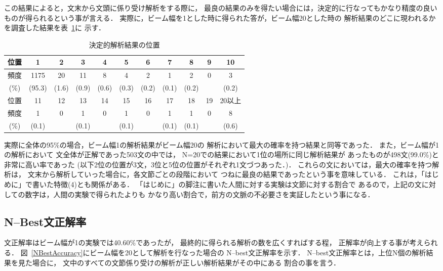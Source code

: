 この結果によると，文末から文頭に係り受け解析をする際に，
最良の結果のみを得たい場合には，決定的に行なってもかなり精度の良い
ものが得られるという事が言える．
実際に，ビーム幅を1とした時に得られた答が，ビーム幅20とした時の
解析結果のどこに現われるかを調査した結果を表~\ref{OneOnTwenty}に
示す．
\begin{table}[tbh]
\caption{決定的解析結果の位置}
\label{OneOnTwenty} 
\begin{center}
\begin{tabular}{|c||c|c|c|c|c|c|c|c|c|c|}
\hline
位置    &    1 &  2 & 3 & 4 & 5 & 6 & 7 & 8 & 9 & 10 \\
\hline
頻度    & 1175 & 20 & 11 & 8 & 4 & 2 & 1 & 2 & 0 & 3 \\ 
(\%)    & (95.3) & (1.6) & (0.9) & (0.6) & (0.3) & (0.2) & (0.1) & (0.2) & & (0.2) \\
\hline
\hline
位置    & 11 & 12 & 13 & 14 & 15 & 16 & 17 & 18 & 19 & 20以上 \\
\hline
頻度    & 1 & 0 & 1 & 0 & 1 & 0 & 1 & 1 & 0 & 8   \\
(\%)    & (0.1) & & (0.1) & & (0.1) & & (0.1) & (0.1) & & (0.6) \\
\hline
\end{tabular}
\end{center}
\end{table}
実際に全体の95\%の場合，ビーム幅1の解析結果がビーム幅20の
解析において最大の確率を持つ結果と同等であった．
また，ビーム幅が1の解析において
文全体が正解であった503文の中では，
N=20での結果において1位の場所に同じ解析結果が
あったものが498文(99.0\%)と非常に高い率であった
(以下2位の位置が3文，3位と5位の位置がそれぞれ1文づつあった．)．
これらの文においては，最大の確率を持つ解析は，
文末から解析していった場合に，各文節ごとの段階において
つねに最良の結果であったという事を意味している．
これは，「はじめに」で書いた特徴(4)とも関係がある．
「はじめに」の脚注に書いた人間に対する実験は文節に対する割合で
あるので，上記の文に対しての数字は，人間の実験で得られたよりも
かなり高い割合で，前方の文脈の不必要さを実証したという事になる．


\subsection{N--Best文正解率}

文正解率はビーム幅が1の実験では40.60\%であったが，
最終的に得られる解析の数を広くすればする程，
正解率が向上する事が考えられる．
図~\ref{NBestAccuracy}にビーム幅を20として解析を行なった場合の
N--best文正解率を示す．
N--best文正解率とは，上位N個の解析結果を見た場合に，
文中のすべての文節係り受けの解析が正しい解析結果がその中にある
割合の事を言う．

